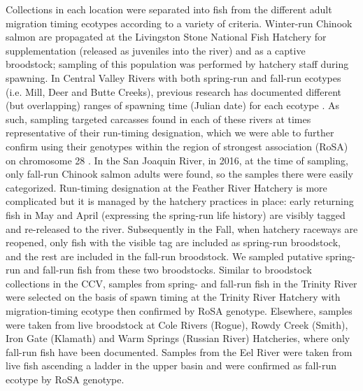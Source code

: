 Collections in each location were separated into fish from the different adult migration timing ecotypes according
to a variety of criteria.  Winter-run Chinook salmon are propagated at the Livingston
Stone National Fish Hatchery for supplementation (released as juveniles into the river) and as a captive broodstock;
sampling of this population was performed by hatchery staff during spawning. In Central Valley Rivers with both
spring-run and fall-run ecotypes (i.e. Mill, Deer and Butte Creeks), previous research has documented different  (but overlapping) ranges of spawning time (Julian date) for each ecotype \citep{fry1961king,yoshiyama1998historical}.
As such, sampling targeted carcasses found in each of these
rivers at times representative of their run-timing designation, which we were able to further confirm using their genotypes
within the region of strongest association (RoSA) on chromosome 28 \citep{thompson2020complex}.
In the San Joaquin River, in 2016, at the time of sampling, only
fall-run Chinook salmon adults were found, so the samples there were
easily categorized. Run-timing
designation at the Feather River Hatchery is more complicated but it is managed by the hatchery practices in place:
early returning fish in May and April (expressing the spring-run life history) are visibly tagged and re-released
to the river. Subsequently in the Fall, when hatchery raceways are reopened, only fish with the visible tag are included
as spring-run broodstock, and the rest are included in the fall-run broodstock. We sampled putative spring-run and fall-run fish 
from these two broodstocks. Similar to broodstock collections in the CCV, samples from spring- and fall-run fish in the Trinity River were selected on the basis of spawn timing at the Trinity River Hatchery with migration-timing ecotype then confirmed by RoSA genotype. Elsewhere, samples were taken from live broodstock at Cole Rivers (Rogue), Rowdy Creek (Smith), Iron Gate (Klamath) and Warm Springs (Russian River) Hatcheries, where only fall-run fish have been documented. Samples from the Eel River were taken from live fish ascending a ladder in the upper basin and were confirmed as fall-run ecotype by RoSA genotype. 




